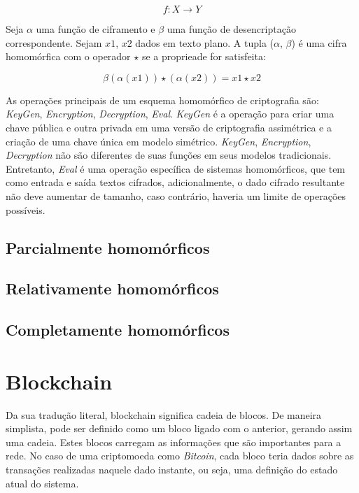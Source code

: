 \documentclass{ufsctex/ufsctex}
\begin{document}
\begin{equation}
{f} : X \longrightarrow Y
\end{equation}

Seja $\alpha$ uma função de ciframento e $\beta$ uma função de desencriptação
correspondente. Sejam $x1$, $x2$ dados em texto plano. A tupla ($\alpha$, $\beta$)
é uma cifra homomórfica com o operador $\star$ se a proprieade for satisfeita:

\begin{equation}
\beta (\alpha(x1)) \star (\alpha(x2)) = x1 \star x2
\end{equation}

As operações principais de um esquema homomórfico de criptografia são: \textit{KeyGen},
\textit{Encryption}, \textit{Decryption}, \textit{Eval}. \textit{KeyGen} é a operação
para criar uma chave pública e outra privada em uma versão de criptografia assimétrica
e a criação de uma chave única em modelo simétrico. \textit{KeyGen}, \textit{Encryption},
\textit{Decryption} não são diferentes de suas funções em seus modelos tradicionais. 
Entretanto, \textit{Eval} é uma operação específica de sistemas homomórficos, que tem
como entrada e saída textos cifrados, adicionalmente, o dado cifrado resultante não deve
aumentar de tamanho, caso contrário, haveria um limite de operações possíveis. \cite{survey-homo}

\subsection{Parcialmente homomórficos}

\subsection{Relativamente homomórficos}

\subsection{Completamente homomórficos}


\section{Blockchain}

Da sua tradução literal, blockchain significa cadeia de blocos. De  maneira
simplista, pode ser definido como um bloco ligado com o anterior, gerando
assim uma cadeia. Estes blocos carregam as informações que são importantes para
a rede. No caso de uma criptomoeda como \textit{Bitcoin}, cada bloco teria dados sobre
as transações realizadas naquele dado instante, ou seja, uma definição do estado
atual do sistema.
\end{document}

